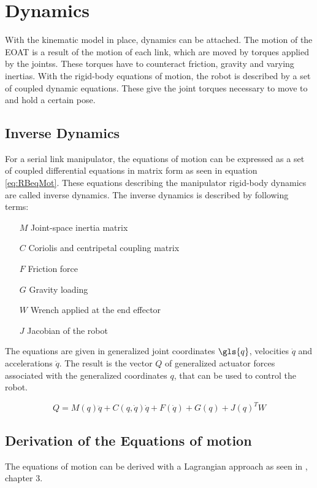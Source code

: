 \section{Dynamics}

With the kinematic model in place, dynamics can be attached. The motion of the \ac{EOAT} is a result of the motion of each link, which are moved by torques applied by the \glspl{joints}. These torques have to counteract friction, gravity and varying inertias.
With the rigid-body equations of motion, the robot is described by a set of coupled dynamic equations. These give the joint torques necessary to move to and hold a certain pose.

\subsection{Inverse Dynamics}

For a serial link manipulator, the equations of motion can be expressed as a set of coupled differential equations in matrix form as seen in equation \ref{eq:RBeqMot}. These equations describing the manipulator rigid-body dynamics are called inverse dynamics.
The inverse dynamics is described by following terms:
\begin{itemize}
	\item[$ M $] Joint-space inertia matrix
	\item[$ C $] Coriolis and centripetal coupling matrix
	\item[$ F $] Friction force
	\item[$ G $] Gravity loading
	\item[$ W $] Wrench applied at the end effector
	\item[$ J $] Jacobian of the robot
\end{itemize}
The equations are given in generalized joint coordinates $\gls{q}$, velocities $\dot{q}$ and accelerations $\ddot{q}$.
The result is the vector $Q$ of generalized actuator forces associated with the generalized coordinates $ q$, that can be used to control the robot.

\begin{equation}\label{eq:RBeqMot}
	Q=M(q)\ddot{q}+C(q,\dot{q})\dot{q}+F(\dot{q})+G(q)+J(q)^TW
\end{equation}


\subsection{Derivation of the Equations of motion}
The equations of motion can be derived with a Lagrangian approach as seen in \cite{MathIntroRobManip}, chapter 3.

